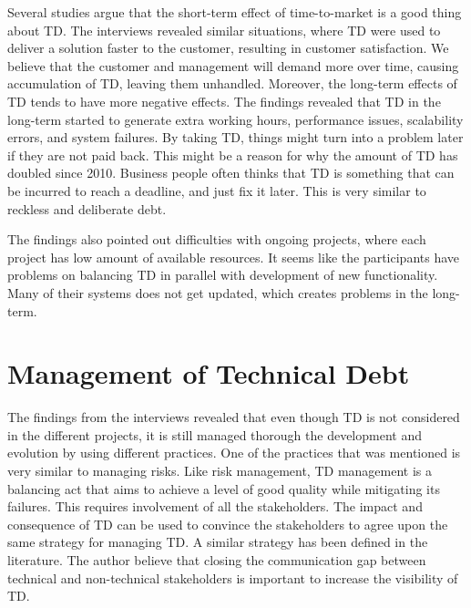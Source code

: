 Several studies argue that the short-term effect of time-to-market is a good thing about TD\cite{lim-taksande,p247-siebra}. The interviews revealed similar situations, where TD were used to deliver a solution faster to the customer, resulting in customer satisfaction. We believe that the customer and management will demand more over time, causing accumulation of TD, leaving them unhandled. Moreover, the long-term effects of TD tends to have more negative effects\cite{lim-taksande,p247-siebra,buschmann2011pay}. The findings revealed that TD in the long-term started to generate extra working hours, performance issues, scalability errors, and system failures. By taking TD, things might turn into a problem later if they are not paid back. This might be a reason for why the amount of TD has doubled since 2010\cite{gartner2010}. Business people often thinks that TD is something that can be incurred to reach a deadline, and just fix it later. This is very similar to reckless and deliberate debt\cite{url-fowler}.

The findings also pointed out difficulties with ongoing projects, where each project has low amount of available resources. It seems like the participants have problems on balancing TD in parallel with development of new functionality. Many of their systems does not get updated, which creates problems in the long-term.







\section{Management of Technical Debt}
The findings from the interviews revealed that even though TD is not considered in the different projects, it is still managed thorough the development and evolution by using different practices. One of the practices that was mentioned is very similar to managing risks. Like risk management, TD management is a balancing act that aims to achieve a level of good quality while mitigating its failures. This requires involvement of all the stakeholders. The impact and consequence of TD can be used to convince the stakeholders to agree upon the same strategy for managing TD. A similar strategy has been defined in the literature\cite{lim-taksande,Theodoropoulos:2011:TDS:1985362.1985373}. The author believe that closing the communication gap between technical and non-technical stakeholders is important to increase the visibility of TD. 

